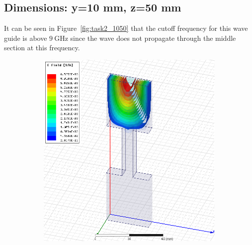 \documentclass[12pt,a4paper]{article}
\begin{document}
\subsection{Dimensions: y=10 mm, z=50 mm}
It can be seen in Figure~\ref{fig:task2_1050} that the cutoff frequency for this wave guide is above $\SI{9}{\giga\hertz}$ since the wave does not propagate through the middle section at this frequency.
\begin{figure}
  \centering
  \begin{subfigure}[b]{0.49\textwidth}
    \includegraphics[width=\textwidth]{./mid_sec_10mm_wide_50mm_long/4ghz.png}
    \label{fig:2_1050_4ghz}
  \end{subfigure}
  \begin{subfigure}[b]{0.49\textwidth}

\end{subfigure}
\end{figure}
\end{document}
